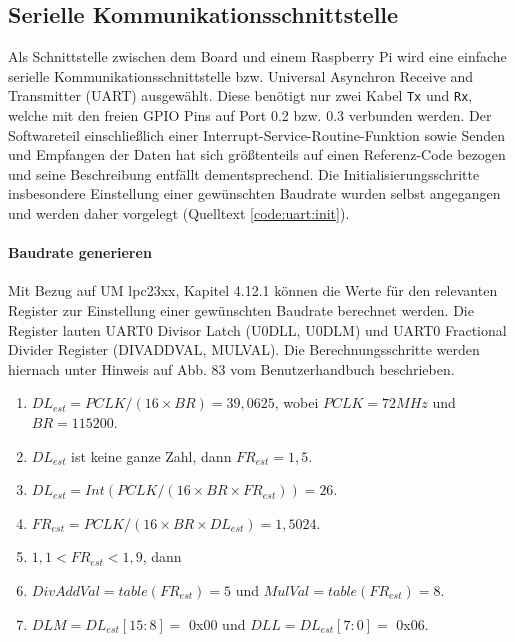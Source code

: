 \subsection{Serielle Kommunikationsschnittstelle}
Als Schnittstelle zwischen dem Board und einem Raspberry Pi wird eine einfache serielle Kommunikationsschnittstelle bzw. Universal Asynchron Receive and Transmitter (UART) ausgewählt. Diese benötigt nur zwei Kabel \texttt{Tx} und \texttt{Rx}, welche mit den freien GPIO Pins auf Port 0.2 bzw. 0.3 verbunden werden. Der Softwareteil einschließlich einer Interrupt-Service-Routine-Funktion sowie Senden und Empfangen der Daten hat sich größtenteils auf einen Referenz-Code bezogen und seine Beschreibung entfällt dementsprechend. Die Initialisierungsschritte insbesondere Einstellung einer gewünschten Baudrate wurden selbst angegangen und werden daher vorgelegt (Quelltext \ref{code:uart:init}).

\paragraph{Baudrate generieren} 

Mit Bezug auf UM lpc23xx, Kapitel 4.12.1 können die Werte für den relevanten Register zur Einstellung einer gewünschten Baudrate berechnet werden. Die Register lauten UART0 Divisor Latch (U0DLL, U0DLM) und UART0 Fractional Divider Register (DIVADDVAL, MULVAL). Die Berechnungsschritte werden hiernach unter Hinweis auf Abb. 83 vom Benutzerhandbuch beschrieben.

\begin{enumerate}
\item $DL_{est} = PCLK/(16 \times BR) = 39,0625$, wobei $PCLK = 72 MHz$ und $BR = 115200$.
\item $DL_{est}$ ist keine ganze Zahl, dann $FR_{est} = 1,5$.
\item $DL_{est} = Int ( PCLK/(16 \times BR \times FR_{est}) ) = 26$.
\item $FR_{est} = PCLK/(16 \times BR \times DL_{est}) = 1,5024$.
\item $1,1 < FR_{est} < 1,9$, dann
\item $DivAddVal = table (FR_{est}) = 5$ und $MulVal = table (FR_{est}) = 8$.
\item $DLM = DL_{est}[15:8] =$ 0x00 und $DLL = DL_{est}[7:0] =$ 0x06.
\end{enumerate}

